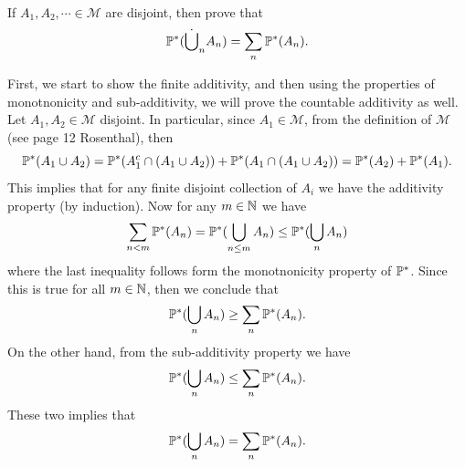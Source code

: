 \begin{problem}
	\label{prob:countableAdditivity}
	If $ A_1,A_2,\cdots \in \mathcal{M} $ are disjoint, then prove that 
	\[ \mathbb{P}^*(\dot\bigcup_n A_n) = \sum_n \mathbb{P}^*(A_n). \]
\end{problem}
\begin{solution}
	First, we start to show the finite additivity, and then using the properties of monotnonicity and sub-additivity, we will prove the countable additivity as well. Let $ A_1, A_2 \in \mathcal{M} $ disjoint. In particular, since $ A_1 \in \mathcal{M} $, from the definition of $ \mathcal{M} $ (see page 12 Rosenthal), then
	\[ \mathbb{P}^*(A_1 \cup A_2) = \mathbb{P}^*(A_1^c \cap (A_1\cup A_2)) + \mathbb{P}^*(A_1 \cap (A_1 \cup A_2)) = \mathbb{P}^*(A_2) + \mathbb{P}^*(A_1). \]
	This implies that for any finite disjoint collection of $ A_i $ we have the additivity property (by induction). Now for any $ m \in \mathbb{N} $ we have
	\[  \sum_{n<m} \mathbb{P}^*(A_n)  = \mathbb{P}^*(\bigcup_{n\leq m}A_n)  \leq \mathbb{P}^*(\bigcup_n A_n) \]
	where the last inequality follows form the monotnonicity property of $ \mathbb{P}^* $. Since this is true for all $ m \in \mathbb{N} $, then we conclude that 
	\[ \mathbb{P}^*(\bigcup_n A_n) \geq \sum_n \mathbb{P}^*(A_n). \]
	On the other hand, from the sub-additivity property we have
	\[ \mathbb{P}^*(\bigcup_n A_n) \leq \sum_n \mathbb{P}^*(A_n). \]
	These two implies that 
	\[ \mathbb{P}^*(\bigcup_n A_n) = \sum_n \mathbb{P}^*(A_n). \]
\end{solution}

